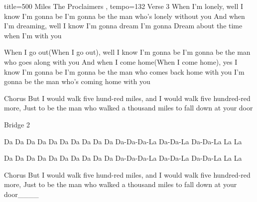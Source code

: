 \begin{song}{
	title={500 Miles The Proclaimers}
,	tempo={132}
}
Verse 3
When I'm lonely, well I know I'm gonna be
I'm gonna be the man who's lonely without you
And when I'm dreaming, well I know I'm gonna dream
I'm gonna Dream about the time when I'm with you

When I go out(When I go out), well I know I'm gonna be
I'm gonna be the man who goes along with you
And when I come home(When I come home), yes I know I'm gonna be
I'm gonna be the man who comes back home with you
I'm gonna be the man who's coming home with you


Chorus
But I would walk five hund-red miles, and
I would walk five hundred-red  more,
Just to be the man who walked a thousand  miles to
fall down at your door   

Bridge 2


Da Da Da Da          Da Da Da Da      Da Da Da-Da-Da-La Da-Da-La Da-Da-La La La

Da Da Da Da           Da Da Da Da      Da Da Da-Da-Da-La Da-Da-La Da-Da-La La La


Chorus
But I would walk five hund-red miles, and
I would walk five hundred-red  more,
Just to be the man who walked a thousand  miles to
fall down  at  your  door____
\end{song}

